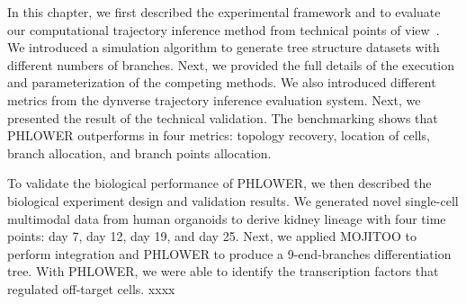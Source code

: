 In this chapter, we first described the experimental framework and to evaluate our computational trajectory inference method from technical points of view~. We introduced a simulation algorithm to generate tree structure datasets with different numbers of branches. Next, we provided the full details of the execution and parameterization of the competing methods. We also introduced different metrics from the dynverse trajectory inference evaluation system. Next, we presented the result of the technical validation. The benchmarking shows that PHLOWER outperforms in four metrics: topology recovery, location of cells, branch allocation, and branch points allocation.

To validate the biological performance of PHLOWER, we then described the biological experiment design and validation results. We generated novel single-cell multimodal data from human organoids to derive kidney lineage with four time points: day 7, day 12, day 19, and day 25. Next, we applied MOJITOO to perform integration and PHLOWER to produce a 9-end-branches differentiation tree. With PHLOWER, we were able to identify the transcription factors that regulated off-target cells. xxxx


